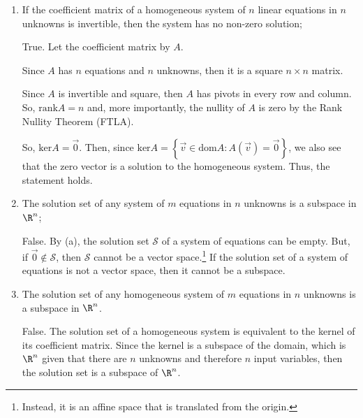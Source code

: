 \documentclass{article}
\begin{document}
\begin{enumerate}[label=(\alph*)]
  \item If the coefficient matrix of a homogeneous system of $n$ linear equations in $n$ unknowns is invertible, then the system has no non-zero solution;

    True. Let the coefficient matrix by $A$. 
    
    Since $A$ has $n$ equations and $n$ unknowns, then it is a square $n\times n$ matrix.

    Since $A$ is invertible and square, then $A$ has pivots in every row and column. So, $\text{rank}A=n$ and, more importantly, the nullity of $A$ is zero by the Rank Nullity Theorem (FTLA).

    So, $\text{ker}A={\vec{0}}$. Then, since $\text{ker}A=\left\{ \vec{v}\in \text{dom}A : A(\vec{v})=\vec{0} \right\} $, we also see that the zero vector is a solution to the homogeneous system. Thus, the statement holds.

  \item The solution set of any system of $m$ equations in $n$ unknowns is a subspace in $\R^{n}$;

    False. By (a), the solution set $\mathcal{S}$ of a system of equations can be empty. But, if $\vec{0}\not\in \mathcal{S}$, then $\mathcal{S}$ cannot be a vector space.\footnote{Instead, it is an affine space that is translated from the origin.} If the solution set of a system of equations is not a vector space, then it cannot be a subspace.

  \item The solution set of any homogeneous system of $m$ equations in $n$ unknowns is a subspace in $\R^{n}$.

    False. The solution set of a homogeneous system is equivalent to the kernel of its coefficient matrix. Since the kernel is a subspace of the domain, which is $\R^{n}$ given that there are $n$ unknowns and therefore $n$ input variables, then the solution set is a subspace of $\R^{n}$.

 \end{enumerate} 
\end{document}
